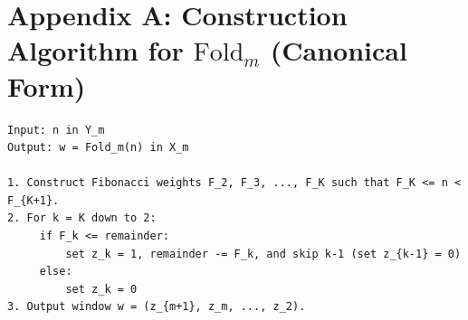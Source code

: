 \section{Appendix A: Construction Algorithm for \texorpdfstring{$\mathrm{Fold}_m$}{Fold\_m} (Canonical Form)}

\begin{verbatim}
Input: n in Y_m
Output: w = Fold_m(n) in X_m

1. Construct Fibonacci weights F_2, F_3, ..., F_K such that F_K <= n < F_{K+1}.
2. For k = K down to 2:
     if F_k <= remainder:
         set z_k = 1, remainder -= F_k, and skip k-1 (set z_{k-1} = 0)
     else:
         set z_k = 0
3. Output window w = (z_{m+1}, z_m, ..., z_2).
\end{verbatim}
